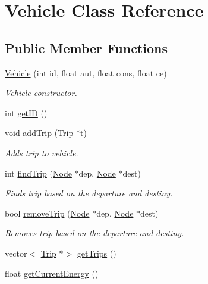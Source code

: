\hypertarget{class_vehicle}{}\section{Vehicle Class Reference}
\label{class_vehicle}
\subsection*{Public Member Functions}
\begin{DoxyCompactItemize}
\item 
\mbox{\hyperlink{class_vehicle_a4291fb819f4f33fde79d80d3c5112260}{Vehicle}} (int id, float aut, float cons, float ce)
\begin{DoxyCompactList}\small\item\em \mbox{\hyperlink{class_vehicle}{Vehicle}} constructor. \end{DoxyCompactList}\item 
int \mbox{\hyperlink{class_vehicle_a65fb09187931545d0a9e695f619ac807}{get\+ID}} ()
\item 
void \mbox{\hyperlink{class_vehicle_a7694d76ed4d0cadd2ae5560d27eb8ff1}{add\+Trip}} (\mbox{\hyperlink{class_trip}{Trip}} $\ast$t)
\begin{DoxyCompactList}\small\item\em Adds trip to vehicle. \end{DoxyCompactList}\item 
int \mbox{\hyperlink{class_vehicle_a9eec5611b31ac4ef92e2df466ead038f}{find\+Trip}} (\mbox{\hyperlink{class_node}{Node}} $\ast$dep, \mbox{\hyperlink{class_node}{Node}} $\ast$dest)
\begin{DoxyCompactList}\small\item\em Finds trip based on the departure and destiny. \end{DoxyCompactList}\item 
bool \mbox{\hyperlink{class_vehicle_a5a5e5b45575b6000ffca90c7da4fcb44}{remove\+Trip}} (\mbox{\hyperlink{class_node}{Node}} $\ast$dep, \mbox{\hyperlink{class_node}{Node}} $\ast$dest)
\begin{DoxyCompactList}\small\item\em Removes trip based on the departure and destiny. \end{DoxyCompactList}\item 
vector$<$ \mbox{\hyperlink{class_trip}{Trip}} $\ast$$>$ \mbox{\hyperlink{class_vehicle_a8c13aa94ebf49bbe64764b53a889a840}{get\+Trips}} ()
\item 
float \mbox{\hyperlink{class_vehicle_a72d38fc28c1d3aa9d0476de3a5704764}{get\+Current\+Energy}} ()
$$
\end{DoxyCompactItemize}
